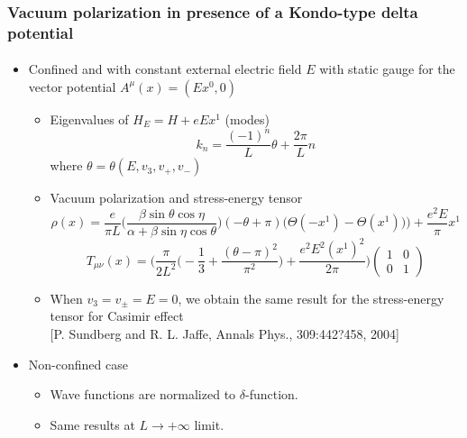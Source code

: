 \documentclass[english]{beamer}
\begin{document}
\begin{frame}[shrink=30]
\frametitle{\small{Vacuum polarization in presence of a Kondo-type delta potential}}
\framesubtitle{}

\begin{itemize}

\item<1-> Confined and with constant external electric field $E$ with static gauge for the vector potential $A^\mu(x) = (Ex^0, 0)$

\begin{itemize}
\item<2-> Eigenvalues of $H_E = H + eEx^1 $ (modes)
\begin{equation*}
k_{n} = \frac{(-1)^n}{L}  \theta + \frac{2\pi}{L}n 
\end{equation*}
where $\theta = \theta(E, v_3, v_+, v_-)$
%
\item<3-> Vacuum polarization and stress-energy tensor
\begin{equation*}
\rho(x) = \frac{e}{\pi L}\Big( \frac{\beta \sin \theta \cos \eta}{\alpha + \beta \sin \eta \cos \theta}\Big) (-\theta + \pi)
\Big(\Theta(- x^1) - \Theta(x^1))\Big) + \frac{e^2 E}{\pi} x^1
\end{equation*}
%
\begin{equation*}
T_{\mu\nu}(x) = 
\bigg( \frac{\pi}{2L^2}\big( -\frac{1}{3} + \frac{(\theta - \pi)^2}{\pi^2}\big) + \frac{e^2E^2(x^1)^2}{2 \pi} \bigg)
\begin{pmatrix}
1 & 0 \\ 0 & 1
\end{pmatrix}
\end{equation*}
%
\item<3-> When $v_3 = v_\pm = E = 0$, we obtain the same result for the stress-energy tensor for Casimir effect \\
\tiny\color{blue}[P. Sundberg and R. L. Jaffe, Annals Phys., 309:442?458, 2004]\normalsize\color{black}
\end{itemize}
%
\item Non-confined case
\begin{itemize}
\item<4-> Wave functions are normalized to $\delta$-function.
\item<5-> Same results at $L\rightarrow +\infty $ limit.
\end{itemize}

\end{itemize}

\end{frame}
\end{document}
